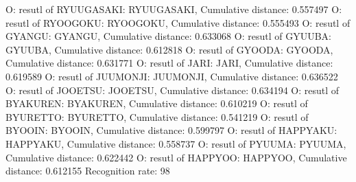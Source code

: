 O: resutl of RYUUGASAKI: RYUUGASAKI, Cumulative distance: 0.557497
O: resutl of RYOOGOKU: RYOOGOKU, Cumulative distance: 0.555493
O: resutl of GYANGU: GYANGU, Cumulative distance: 0.633068
O: resutl of GYUUBA: GYUUBA, Cumulative distance: 0.612818
O: resutl of GYOODA: GYOODA, Cumulative distance: 0.631771
O: resutl of JARI: JARI, Cumulative distance: 0.619589
O: resutl of JUUMONJI: JUUMONJI, Cumulative distance: 0.636522
O: resutl of JOOETSU: JOOETSU, Cumulative distance: 0.634194
O: resutl of BYAKUREN: BYAKUREN, Cumulative distance: 0.610219
O: resutl of BYURETTO: BYURETTO, Cumulative distance: 0.541219
O: resutl of BYOOIN: BYOOIN, Cumulative distance: 0.599797
O: resutl of HAPPYAKU: HAPPYAKU, Cumulative distance: 0.558737
O: resutl of PYUUMA: PYUUMA, Cumulative distance: 0.622442
O: resutl of HAPPYOO: HAPPYOO, Cumulative distance: 0.612155
Recognition rate: 98%
